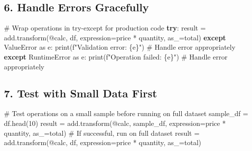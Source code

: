 \documentclass[
  letterpaper,
]{scrbook}
\newenvironment{Shaded}{\begin{snugshade}}{\end{snugshade}}
\newcommand{\BuiltInTok}[1]{\textcolor[rgb]{0.00,0.23,0.31}{#1}}
\newcommand{\CommentTok}[1]{\textcolor[rgb]{0.37,0.37,0.37}{#1}}
\newcommand{\ControlFlowTok}[1]{\textcolor[rgb]{0.00,0.23,0.31}{\textbf{#1}}}
\newcommand{\DecValTok}[1]{\textcolor[rgb]{0.68,0.00,0.00}{#1}}
\newcommand{\ImportTok}[1]{\textcolor[rgb]{0.00,0.46,0.62}{#1}}
\newcommand{\NormalTok}[1]{\textcolor[rgb]{0.00,0.23,0.31}{#1}}
\newcommand{\OperatorTok}[1]{\textcolor[rgb]{0.37,0.37,0.37}{#1}}
\newcommand{\PreprocessorTok}[1]{\textcolor[rgb]{0.68,0.00,0.00}{#1}}
\newcommand{\SpecialCharTok}[1]{\textcolor[rgb]{0.37,0.37,0.37}{#1}}
\newcommand{\SpecialStringTok}[1]{\textcolor[rgb]{0.13,0.47,0.30}{#1}}
\newcommand{\StringTok}[1]{\textcolor[rgb]{0.13,0.47,0.30}{#1}}
\begin{document}
\subsection{6. Handle Errors Gracefully}\label{handle-errors-gracefully}

\begin{Shaded}
\begin{Highlighting}[]
\CommentTok{\# Wrap operations in try{-}except for production code}
\ControlFlowTok{try}\NormalTok{:}
\NormalTok{    result }\OperatorTok{=}\NormalTok{ add.transform(}\StringTok{\textquotesingle{}@calc\textquotesingle{}}\NormalTok{, df, expression}\OperatorTok{=}\StringTok{\textquotesingle{}price * quantity\textquotesingle{}}\NormalTok{, as\_}\OperatorTok{=}\StringTok{\textquotesingle{}total\textquotesingle{}}\NormalTok{)}
\ControlFlowTok{except} \PreprocessorTok{ValueError} \ImportTok{as}\NormalTok{ e:}
    \BuiltInTok{print}\NormalTok{(}\SpecialStringTok{f"Validation error: }\SpecialCharTok{\{}\NormalTok{e}\SpecialCharTok{\}}\SpecialStringTok{"}\NormalTok{)}
    \CommentTok{\# Handle error appropriately}
\ControlFlowTok{except} \PreprocessorTok{RuntimeError} \ImportTok{as}\NormalTok{ e:}
    \BuiltInTok{print}\NormalTok{(}\SpecialStringTok{f"Operation failed: }\SpecialCharTok{\{}\NormalTok{e}\SpecialCharTok{\}}\SpecialStringTok{"}\NormalTok{)}
    \CommentTok{\# Handle error appropriately}
\end{Highlighting}
\end{Shaded}

\subsection{7. Test with Small Data
First}\label{test-with-small-data-first}

\begin{Shaded}
\begin{Highlighting}[]
\CommentTok{\# Test operations on a small sample before running on full dataset}
\NormalTok{sample\_df }\OperatorTok{=}\NormalTok{ df.head(}\DecValTok{10}\NormalTok{)}
\NormalTok{result }\OperatorTok{=}\NormalTok{ add.transform(}\StringTok{\textquotesingle{}@calc\textquotesingle{}}\NormalTok{, sample\_df, expression}\OperatorTok{=}\StringTok{\textquotesingle{}price * quantity\textquotesingle{}}\NormalTok{, as\_}\OperatorTok{=}\StringTok{\textquotesingle{}total\textquotesingle{}}\NormalTok{)}
\CommentTok{\# If successful, run on full dataset}
\NormalTok{result }\OperatorTok{=}\NormalTok{ add.transform(}\StringTok{\textquotesingle{}@calc\textquotesingle{}}\NormalTok{, df, expression}\OperatorTok{=}\StringTok{\textquotesingle{}price * quantity\textquotesingle{}}\NormalTok{, as\_}\OperatorTok{=}\StringTok{\textquotesingle{}total\textquotesingle{}}\NormalTok{)}
\end{Highlighting}
\end{Shaded}
\end{document}
